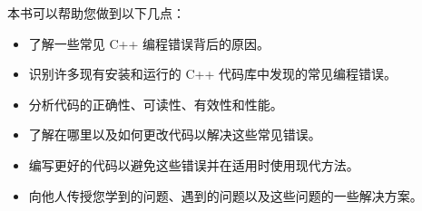 
本书可以帮助您做到以下几点：

\begin{itemize}
\item
了解一些常见 C++ 编程错误背后的原因。

\item
识别许多现有安装和运行的 C++ 代码库中发现的常见编程错误。

\item
分析代码的正确性、可读性、有效性和性能。

\item
了解在哪里以及如何更改代码以解决这些常见错误。

\item
编写更好的代码以避免这些错误并在适用时使用现代方法。

\item
向他人传授您学到的问题、遇到的问题以及这些问题的一些解决方案。
\end{itemize}
